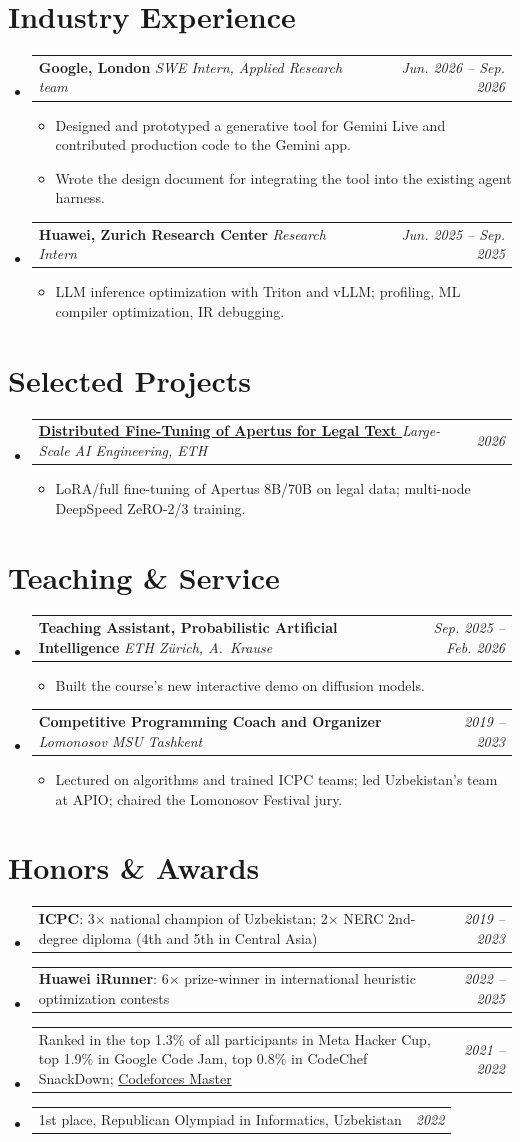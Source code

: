 \documentclass[10pt]{article}
\makeatletter
\newcommand{\resumeItem}[1]{\item #1}
\newcommand{\resumeTimeItem}[2]{%
    \item\begin{tabularx}{\linewidth}[t]{@{}X@{\hspace{0.8em}}r@{}}%
    #1 & \textit{\small #2}\\
    \end{tabularx}\par}
\newcommand{\resumeSubheading}[3]{%
    \item\begin{tabularx}{\linewidth}[t]{@{}X@{\hspace{0.8em}}r@{}}%
    \textbf{#1} \textit{\small #2} & \textit{\small #3}\\
    \end{tabularx}\par}
\newcommand{\resumeSubHeadingListStart}{\begin{itemize}[leftmargin=1.2em,topsep=0pt,partopsep=0pt,itemsep=1pt,parsep=0pt]}
\newcommand{\resumeSubHeadingListEnd}{\end{itemize}}
\newcommand{\resumeItemListStart}{\begin{itemize}[leftmargin=1.2em,topsep=0pt,partopsep=0pt,itemsep=0pt,parsep=0pt]}
\newcommand{\resumeItemListEnd}{\end{itemize}}
\newcommand{\linked}[2]{%
    \href{#1}{#2\nobreak\hspace{0.15em}%
    \textcolor{MidnightBlue}{\raisebox{0.2ex}{\scriptsize$\nearrow$}}}}
\makeatother
\begin{document}
\section{Industry Experience}
\resumeSubHeadingListStart
    \resumeSubheading{Google, London}{SWE Intern, Applied Research team}{Jun. 2026 -- Sep. 2026}
        \resumeItemListStart
        \resumeItem{Designed and prototyped a generative tool for Gemini Live and contributed production code to the Gemini app.}
        \resumeItem{Wrote the design document for integrating the tool into the existing agent harness.}
        \resumeItemListEnd
    \resumeSubheading{Huawei, Zurich Research Center}{Research Intern}{Jun. 2025 -- Sep. 2025}
        \resumeItemListStart
        \resumeItem{LLM inference optimization with Triton and vLLM; profiling, ML compiler optimization, IR debugging.}
        \resumeItemListEnd
\resumeSubHeadingListEnd

\section{Selected Projects}
\resumeSubHeadingListStart
    \resumeSubheading
        {\linked{https://github.com/AkmalAshirmatov/peft_apertus}{Distributed Fine-Tuning of Apertus for Legal Text}}
        {Large-Scale AI Engineering, ETH}{2026}
        \resumeItemListStart
        \resumeItem{LoRA/full fine-tuning of Apertus 8B/70B on legal data; multi-node DeepSpeed ZeRO-2/3 training.}
        \resumeItemListEnd
\resumeSubHeadingListEnd

\section{Teaching \& Service}
\resumeSubHeadingListStart
    \resumeSubheading{Teaching Assistant, Probabilistic Artificial Intelligence}{ETH Z\"urich, A.\ Krause}{Sep. 2025 -- Feb. 2026}
        \resumeItemListStart
        \resumeItem{Built the course's new interactive demo on diffusion models.}
        \resumeItemListEnd
    \resumeSubheading{Competitive Programming Coach and Organizer}{Lomonosov MSU Tashkent}{2019 -- 2023}
        \resumeItemListStart
        \resumeItem{Lectured on algorithms and trained ICPC teams; led Uzbekistan's team at APIO; chaired the Lomonosov Festival jury.}
        \resumeItemListEnd
\resumeSubHeadingListEnd

\section{Honors \& Awards}
\resumeSubHeadingListStart
    \resumeTimeItem{\textbf{ICPC}: 3$\times$ national champion of Uzbekistan; 2$\times$ NERC 2nd-degree diploma (4th and 5th in Central Asia)}{2019 -- 2023}
    \resumeTimeItem{\textbf{Huawei iRunner}: 6$\times$ prize-winner in international heuristic optimization contests}{2022 -- 2025}
    \resumeTimeItem{Ranked in the top 1.3\% of all participants in Meta Hacker Cup, top 1.9\% in Google Code Jam, top 0.8\% in CodeChef SnackDown; \linked{https://codeforces.com/profile/Capitan}{Codeforces Master}}{2021 -- 2022}
    \resumeTimeItem{1st place, Republican Olympiad in Informatics, Uzbekistan}{2022}
\resumeSubHeadingListEnd
\end{document}
